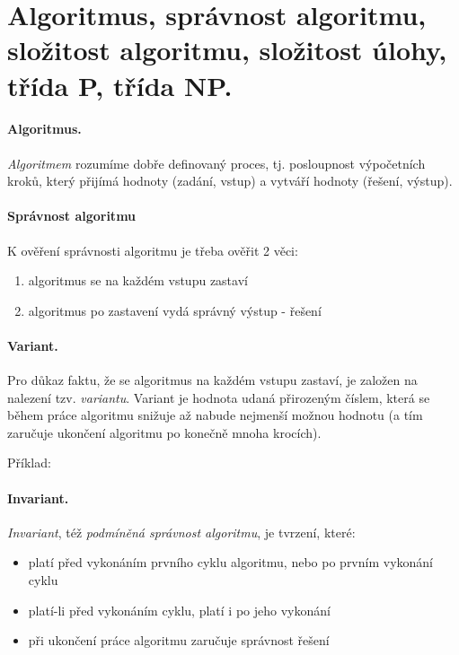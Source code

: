\section[TAL - Algoritmus, P, NP]{Algoritmus, správnost algoritmu, složitost algoritmu, složitost úlohy, třída P, třída NP.}

\paragraph{Algoritmus.}
\label{algoritmus}
\emph{Algoritmem} rozumíme dobře definovaný proces, tj. posloupnost výpočetních kroků, který přijímá hodnoty (zadání, vstup) a vytváří hodnoty (řešení, výstup).

\paragraph{Správnost algoritmu}
K ověření správnosti algoritmu je třeba ověřit 2 věci:
\begin{enumerate}[itemsep=0pt]
    \item algoritmus se na každém vstupu zastaví
    \item algoritmus po zastavení vydá správný výstup - řešení
\end{enumerate}

\paragraph{Variant.}
Pro důkaz faktu, že se algoritmus na každém vstupu zastaví, je založen na nalezení tzv. \emph{variantu}. Variant je hodnota udaná přirozeným číslem, která se během práce algoritmu snižuje až nabude nejmenší možnou hodnotu (a tím zaručuje ukončení algoritmu po konečně mnoha krocích).

Příklad:

\paragraph{Invariant.}
\emph{Invariant}, též \emph{podmíněná správnost algoritmu}, je tvrzení, které:
\begin{itemize}[itemsep=0pt]
    \item platí před vykonáním prvního cyklu algoritmu, nebo po prvním vykonání cyklu
    \item platí-li před vykonáním cyklu, platí i po jeho vykonání
    \item při ukončení práce algoritmu zaručuje správnost řešení
\end{itemize}

